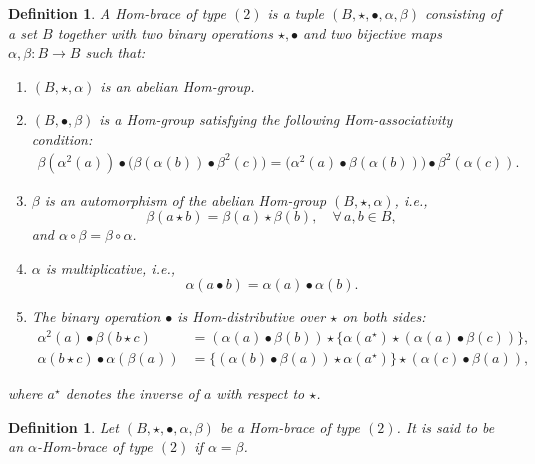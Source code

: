 \documentclass[14pt]{article}
\theoremstyle{Definition}
\newtheorem{Def}[thm]{Definition}
\theoremstyle{remark}
\begin{document}
\begin{Def}
A \emph{Hom-brace of type $(2)$} is a tuple $(B,\star,\bullet,\alpha,\beta)$ consisting of a set $B$ together with two binary operations $\star,\bullet$ and two bijective maps $\alpha,\beta:B\rightarrow B$ such that:
\begin{enumerate}
\item[(i)] $(B,\star,\alpha)$ is an abelian Hom-group.
\item[(ii)] $(B,\bullet,\beta)$ is a Hom-group satisfying the following Hom-associativity condition:
\begin{align*}
\beta(\alpha^{2}(a))\bullet\big(\beta(\alpha(b))\bullet \beta^{2}(c)\big) 
= \big(\alpha^{2}(a)\bullet \beta(\alpha(b))\big)\bullet \beta^{2}(\alpha(c)).
\end{align*}
\item[(iii)] $\beta$ is an automorphism of the abelian Hom-group $(B,\star,\alpha)$, i.e.,
$$\beta(a\star b)=\beta(a)\star \beta(b), \quad \forall\, a,b\in B,$$
and $\alpha\circ \beta=\beta\circ\alpha$.
\item[(iv)] $\alpha$ is multiplicative, i.e.,
$$\alpha(a\bullet b)=\alpha(a)\bullet \alpha(b).$$
\item[(v)] The binary operation $\bullet$ is Hom-distributive over $\star$ on both sides:
\begin{align*}
\alpha^{2}(a)\bullet\beta(b\star c) &= (\alpha(a)\bullet\beta(b))\star\{\alpha(a^{\star})\star(\alpha(a)\bullet\beta(c))\},\\
\alpha(b\star c)\bullet \alpha(\beta(a)) &=\{ (\alpha(b)\bullet\beta(a))\star \alpha(a^{\star})\}\star(\alpha(c)\bullet\beta(a)),
\end{align*}
\end{enumerate}
where $a^{\star}$ denotes the inverse of $a$ with respect to $\star$.
\end{Def}

\begin{Def}
Let $(B,\star,\bullet,\alpha,\beta)$ be a Hom-brace of type $(2)$. It is said to be an \emph{$\alpha$-Hom-brace of type $(2)$} if $\alpha=\beta$.
\end{Def}
\end{document}
